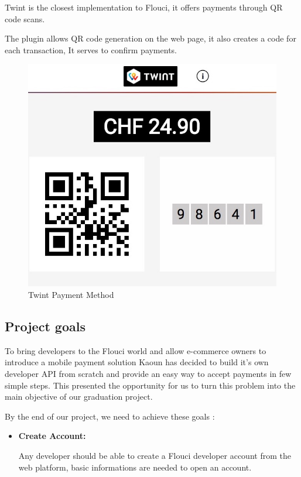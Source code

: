 \begin{spacing}{1.2}
\begin{itemize}
Twint is the closest implementation to Flouci, it offers payments through QR code scans.

The plugin allows QR code generation on the web page, it also creates a code for each transaction, It serves to confirm payments.
\begin{figure}[!ht]\centering
\includegraphics[scale=0.3]{twint.jpg}
\caption{Twint Payment Method}
\label{fig:fig1}
\end{figure}
  \end{itemize}

\subsection{Project goals}
To bring developers to the Flouci world and allow e-commerce owners to introduce a mobile payment solution Kaoun has decided to build it's own developer API from scratch and provide an easy way to accept payments in few simple steps. This presented the opportunity for us to turn this problem into the main objective of our graduation project.

By the end of our project, we need to achieve these goals :
\begin{itemize}
  \item \textbf{Create Account:}
  
  Any developer should be able to create a Flouci developer account from the web platform, basic informations are needed to open an account.
  

\end{itemize}
\end{spacing}
